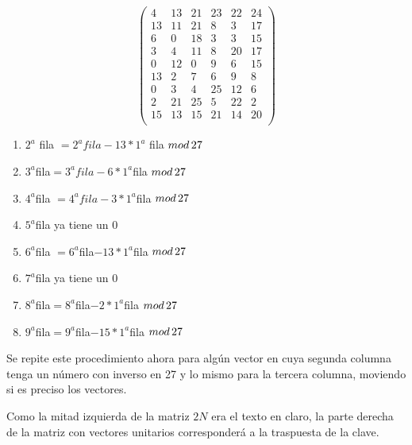 \documentclass{article}
\begin{document}
\begin{equation*}
    \left(     \begin{array}{cccccc}
    4 & 13 & 21 & 23 & 22 & 24 \\
    13 & 11 & 21 & 8 & 3 & 17 \\
    6 & 0 & 18 & 3 & 3 & 15 \\
    3 & 4 & 11 & 8 & 20 & 17 \\
    0 & 12 & 0 & 9 & 6 & 15 \\
    13 & 2 & 7 & 6 & 9 & 8 \\
    0 & 3 & 4 & 25 & 12 & 6 \\
    2 & 21 & 25 & 5 & 22 & 2 \\
    15 & 13 & 15 & 21 & 14 & 20 \\
    \end{array} \right) 
\end{equation*}

\begin{enumerate}
    \item[a)] $2^{a}$ fila $ = 2^a fila - 13 *1^a$ fila $ mod \thinspace  27$
    \item[b)] $3^{a} $fila$ = 3^a fila - 6 *1^a $fila $ mod \thinspace 27$
    \item[c)] $4^{a} $fila $ = 4^a fila - 3 *1^a $fila $ mod \thinspace 27$
    \item[d)] $5^{a} $fila ya tiene un 0
    \item[e)] $6^{a} $fila $ = 6^a $fila$ - 13 *1^a $fila $  mod \thinspace 27$
    \item[f)] $7^{a} $fila ya tiene un 0
    \item[g)] $8^{a} $fila$ = 8^a $fila$ - 2 *1^a $fila $ mod \thinspace 27$
    \item[h)] $9^{a} $fila$ = 9^a $fila$ - 15 *1^a $fila $  mod \thinspace 27$
\end{enumerate}
\justify
Se repite este procedimiento ahora para algún vector en cuya segunda columna tenga un número con inverso en 27 y lo mismo para la tercera columna, moviendo si es preciso los vectores. 

Como la mitad izquierda de la matriz $2N$ era el texto en claro, la parte derecha de la matriz con vectores unitarios corresponderá a la traspuesta de la clave. 
\end{document}
